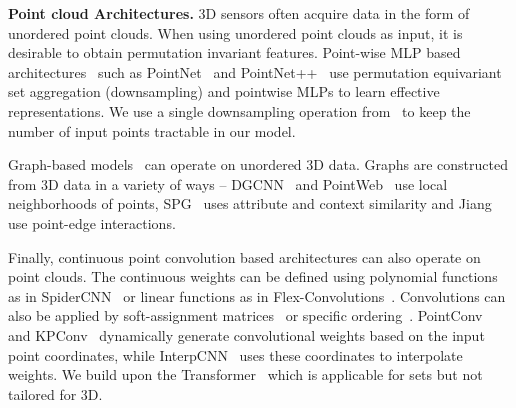 \documentclass[10pt,twocolumn,letterpaper]{article}
\begin{document}
\par \noindent \textbf{Point cloud Architectures.}
3D sensors often acquire data in the form of unordered point clouds.
When using unordered point clouds as input, it is desirable to obtain permutation invariant features.
Point-wise MLP based architectures~\cite{yang2019modeling,hu2020randla} such as PointNet~\cite{qi2017pointnet} and PointNet++~\cite{qi2017pointnet++} use permutation equivariant set aggregation (downsampling) and pointwise MLPs to learn effective representations. We use a single downsampling operation from~\cite{qi2017pointnet++} to keep the number of input points tractable in our model.

Graph-based models~\cite{wang2019graph,li2019deepgcns} can operate on unordered 3D data.
Graphs are constructed from 3D data in a variety of ways -- DGCNN~\cite{wang2019dynamic} and PointWeb~\cite{zhao2019pointweb} use local neighborhoods of points, SPG~\cite{landrieu2018large} uses attribute and context similarity and Jiang \etal~\cite{jiang2019hierarchical} use point-edge interactions.

Finally, continuous point convolution based architectures can also operate on point clouds.
The continuous weights can be defined using polynomial functions as in SpiderCNN~\cite{xu2018spidercnn} or linear functions as in Flex-Convolutions~\cite{groh2018flex}.
Convolutions can also be applied by soft-assignment matrices~\cite{verma2018feastnet} or specific ordering~\cite{li2018pointcnn}.
PointConv~\cite{wu2019pointconv} and KPConv~\cite{thomas2019kpconv} dynamically generate convolutional weights based on the input point coordinates, while InterpCNN~\cite{mao2019interpolated} uses these coordinates to interpolate weights.
We build upon the Transformer~\cite{vaswani2017attention} which is applicable for sets but not tailored for 3D.
\end{document}
